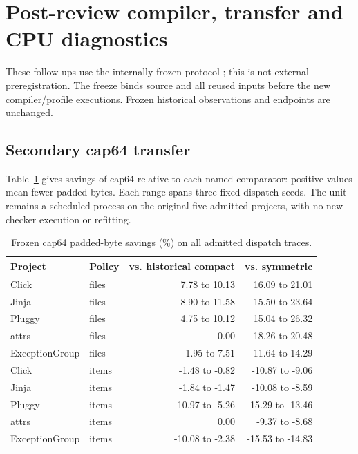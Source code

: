 \section{Post-review compiler, transfer and CPU diagnostics}
These follow-ups use the internally frozen protocol
; this is not external preregistration.
The freeze binds source and all reused inputs before the new compiler/profile
executions. Frozen historical observations and endpoints are unchanged.

\subsection{Secondary cap64 transfer}
Table~\ref{tab:s-cap64} gives savings of cap64 relative to each named
comparator: positive values mean fewer padded bytes. Each range spans three
fixed dispatch seeds. The unit remains a scheduled process on the original
five admitted projects, with no new checker execution or refitting.
\begin{table}[htbp]\centering\small
\caption{Frozen cap64 padded-byte savings (\%) on all admitted dispatch traces.}
\label{tab:s-cap64}
\begin{tabular}{@{}llrr@{}}\toprule
Project & Policy & vs. historical compact & vs. symmetric\\\midrule
Click & files & 7.78 to 10.13 & 16.09 to 21.01 \\
Jinja & files & 8.90 to 11.58 & 15.50 to 23.64 \\
Pluggy & files & 4.75 to 10.12 & 15.04 to 26.32 \\
attrs & files & 0.00 & 18.26 to 20.48 \\
ExceptionGroup & files & 1.95 to 7.51 & 11.64 to 14.29 \\
Click & items & -1.48 to -0.82 & -10.87 to -9.06 \\
Jinja & items & -1.84 to -1.47 & -10.08 to -8.59 \\
Pluggy & items & -10.97 to -5.26 & -15.29 to -13.46 \\
attrs & items & 0.00 & -9.37 to -8.68 \\
ExceptionGroup & items & -10.08 to -2.38 & -15.53 to -14.83 \\
\bottomrule\end{tabular}\end{table}

